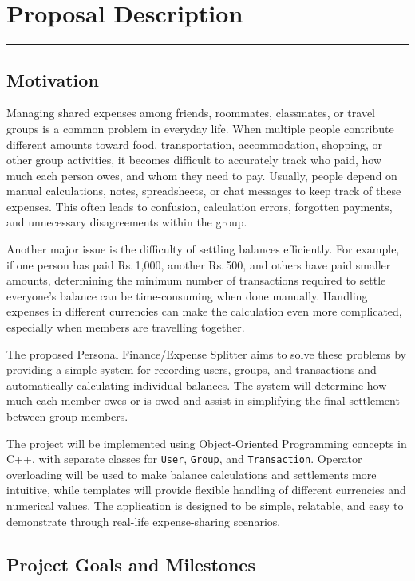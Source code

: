 \documentclass[11pt,a4paper]{article}
\begin{document}
\clearpage
\section*{Proposal Description}
\noindent\rule{\linewidth}{0.8pt}

\subsection*{Motivation}

Managing shared expenses among friends, roommates, classmates, or travel groups is a common problem in everyday life. When multiple people contribute different amounts toward food, transportation, accommodation, shopping, or other group activities, it becomes difficult to accurately track who paid, how much each person owes, and whom they need to pay. Usually, people depend on manual calculations, notes, spreadsheets, or chat messages to keep track of these expenses. This often leads to confusion, calculation errors, forgotten payments, and unnecessary disagreements within the group.

Another major issue is the difficulty of settling balances efficiently. For example, if one person has paid Rs.\,1{,}000, another Rs.\,500, and others have paid smaller amounts, determining the minimum number of transactions required to settle everyone's balance can be time-consuming when done manually. Handling expenses in different currencies can make the calculation even more complicated, especially when members are travelling together.

The proposed Personal Finance/Expense Splitter aims to solve these problems by providing a simple system for recording users, groups, and transactions and automatically calculating individual balances. The system will determine how much each member owes or is owed and assist in simplifying the final settlement between group members.

The project will be implemented using Object-Oriented Programming concepts in C++, with separate classes for \texttt{User}, \texttt{Group}, and \texttt{Transaction}. Operator overloading will be used to make balance calculations and settlements more intuitive, while templates will provide flexible handling of different currencies and numerical values. The application is designed to be simple, relatable, and easy to demonstrate through real-life expense-sharing scenarios.

\subsection*{Project Goals and Milestones}
\end{document}
